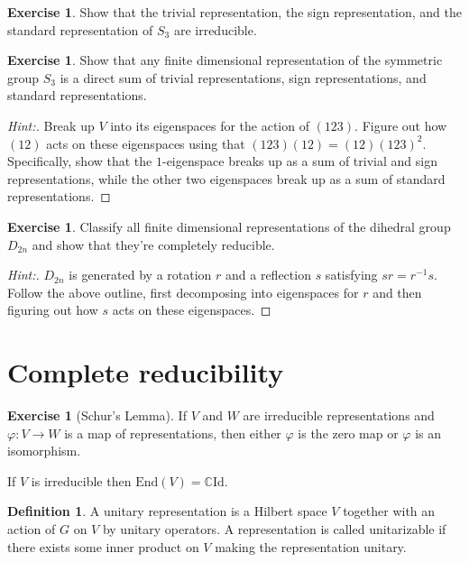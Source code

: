 \documentclass[11pt]{article}
\theoremstyle{plain}
\theoremstyle{definition}
\newtheorem{definition}[proposition]{Definition}
\newtheorem{exercise}[proposition]{Exercise}
\theoremstyle{remark}
\begin{document}
\begin{exercise}
Show that the trivial representation, the sign representation, and the standard representation of $S_3$ are irreducible.
\end{exercise}

\begin{exercise}
Show that any finite dimensional representation of the symmetric group $S_3$ is a direct sum of trivial representations, sign representations, and standard representations.
\end{exercise}
\begin{proof}[Hint:]
Break up $V$ into its eigenspaces for the action of $(123)$.  Figure out how $(12)$ acts on these eigenspaces using that $(123)(12) = (12)(123)^2$.  Specifically, show that the $1$-eigenspace breaks up as a sum of trivial and sign representations, while the other two eigenspaces break up as a sum of standard representations.
\end{proof}

\begin{exercise}
Classify all finite dimensional representations of the dihedral group $D_{2n}$ and show that they're completely reducible.
\end{exercise}
\begin{proof}[Hint:]
$D_{2n}$ is generated by a rotation $r$ and a reflection $s$ satisfying $s r = r^{-1} s$.  Follow the above outline, first decomposing into eigenspaces for $r$ and then figuring out how $s$ acts on these eigenspaces.
\end{proof}

\section{Complete reducibility}

\begin{exercise}[Schur's Lemma]
If $V$ and $W$ are irreducible representations and $\varphi: V \rightarrow W$ is a map of representations, then either $\varphi$ is the zero map or $\varphi$ is an isomorphism.

If $V$ is irreducible then $\mathrm{End}(V) = \mathbb{C} \mathrm{Id}$. 
\end{exercise}

\begin{definition}
A unitary representation is a Hilbert space $V$ together with an action of $G$ on $V$ by unitary operators.  A representation is called unitarizable if there exists some inner product on $V$ making the representation unitary.
\end{definition}
\end{document}
